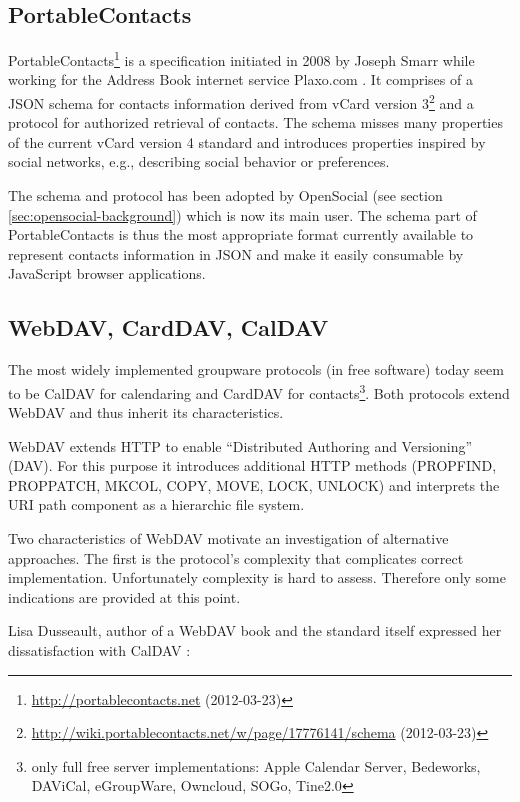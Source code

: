 \documentclass[11pt,a4paper,headsepline,twoside]{scrartcl}		%
\newcommand{\citeurl}[2]{\url{#1} (#2)}
\begin{document}
\subsection{PortableContacts}
\label{sec:portablecontacts}

PortableContacts\footnote{\citeurl{http://portablecontacts.net}{2012-03-23}} is
a specification initiated in 2008 by Joseph Smarr while working for the Address
Book internet service
Plaxo.com \cite{Smarr2008}. It
comprises of a JSON schema for contacts information derived from vCard version
3\footnote{\citeurl{http://wiki.portablecontacts.net/w/page/17776141/schema}{2012-03-23}}
and a protocol for authorized retrieval of contacts. The schema misses many
properties of the current vCard version 4 standard \cite{RFC6350} and introduces
properties inspired by social networks, e.g., describing social behavior or
preferences.

The schema and protocol has been adopted by OpenSocial (see section
\ref{sec:opensocial-background}) which is now its main user. The schema part of
PortableContacts is thus the most appropriate format currently available to
represent contacts information in JSON and make it easily consumable by
JavaScript browser applications.

\subsection{WebDAV, CardDAV, CalDAV}
\label{sec:carddav-caldav}

The most widely implemented groupware protocols (in free software) today seem to
be CalDAV \cite{RFC4791} for calendaring and CardDAV \cite{RFC6352} for
contacts\footnote{only full free server implementations: Apple Calendar Server,
  Bedeworks, DAViCal, eGroupWare, Owncloud, SOGo, Tine2.0}. Both protocols
extend WebDAV \cite{RFC4918} and thus inherit its characteristics.

WebDAV extends HTTP to enable ``Distributed Authoring and Versioning''
(DAV). For this purpose it introduces additional HTTP methods (PROPFIND,
PROPPATCH, MKCOL, COPY, MOVE, LOCK, UNLOCK) and interprets the URI path
component as a hierarchic file system.

Two characteristics of WebDAV motivate an investigation of alternative
approaches. The first is the protocol's complexity that complicates correct
implementation. Unfortunately complexity is hard to assess. Therefore only some
indications are provided at this point.

Lisa Dusseault, author of a WebDAV book \cite{Dusseault2004} and the standard
itself expressed her dissatisfaction with CalDAV \cite{Dusseault2008}:
\end{document}

